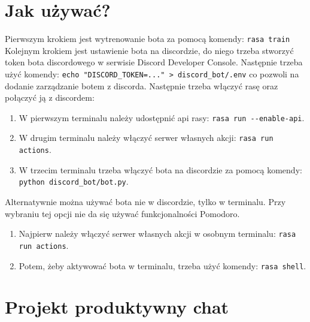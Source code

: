 \documentclass{article}
\begin{document}
\section{Jak używać?}
Pierwszym krokiem jest wytrenowanie bota za pomocą komendy:
\verb|rasa train|
Kolejnym krokiem jest ustawienie bota na discordzie, do niego trzeba stworzyć
token bota discordowego w serwisie Discord Developer Console. Następnie trzeba
użyć komendy:
\verb|echo "DISCORD_TOKEN=..." > discord_bot/.env|
co pozwoli na dodanie zarządzanie botem z discorda.
Następnie trzeba włączyć rasę oraz połączyć ją z discordem:
\begin{enumerate}
    \item W pierwszym terminalu należy udostępnić api rasy: 
        \verb|rasa run --enable-api|.
    \item W drugim terminalu należy włączyć serwer własnych akcji:
        \verb|rasa run actions|.
    \item W trzecim terminalu trzeba włączyć bota na discordzie za pomocą
        komendy: \verb|python discord_bot/bot.py|.
\end{enumerate}
Alternatywnie można używać bota nie w discordzie, tylko w terminalu. Przy
wybraniu tej opcji nie da się używać funkcjonalności Pomodoro.
\begin{enumerate}
    \item Najpierw należy włączyć serwer własnych akcji w osobnym terminalu:
        \verb|rasa run actions|.
    \item Potem, żeby aktywować bota w terminalu, trzeba użyć komendy: 
        \verb|rasa shell|.
\end{enumerate}
\section{Projekt produktywny chat}
\end{document}
